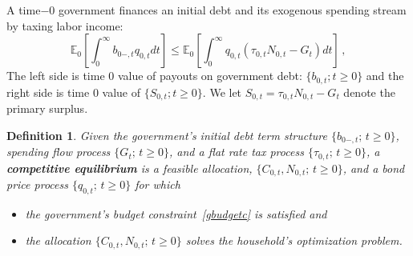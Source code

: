 \documentclass[12pt]{article}
\newtheorem{definition}{Definition}
\begin{document}
A time$-0$ government finances  an  initial debt and its exogenous spending stream by taxing labor income:
\begin{equation}\label{gbudgetc} 
\mathbb{E}_0 \left[ \int_{0}^{\infty} b_{0-, t} q_{0, t} dt \right] \leq  {\mathbb E}_0 \left[\int_0^{\infty}  q_{0, t} \left( \tau_{0, t} N_{0, t} -G_{t} \right) d t\right] \, ,
\end{equation} 
The left  side is   time 0  value of payouts on government debt: $\{b_{0, t}; t\geq 0\}$ and the right  side is time 0 value of $\{S_{0, t}; t\geq 0\}$. We let $S_{0, t}=\tau_{0, t}N_{0, t}-G_t$ denote the primary surplus. 

\begin{definition}\label{defn1}
	Given the government's initial debt term structure $\{b_{0-,t};\, t \ge 0\}$, spending flow process $\{G_t;\, t \ge 0\}$, and a flat rate tax process $\{\tau_{0,t};\, t \ge 0\}$, a \textbf{competitive equilibrium} is a feasible allocation, $\{C_{0,t}, N_{0,t};\, t \ge 0\}$, and a bond price process $\{q_{0,t};\, t \ge 0\}$ for which
	\begin{itemize}
		\item the government's budget constraint~\eqref{gbudgetc} is satisfied and
		\item the allocation $\{C_{0,t}, N_{0,t};\, t \ge 0\}$ solves the household's optimization problem.
	\end{itemize}
\end{definition}
\end{document}
